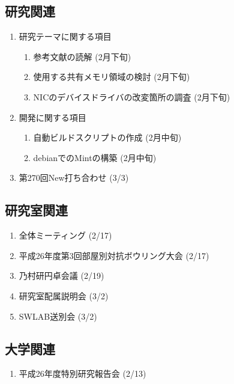 \documentclass[fleqn, 14pt]{extarticle}
\begin{document}
\subsection{研究関連}
\label{sec-4-1}

\begin{enumerate}
\item 研究テーマに関する項目
\hfill
\begin{enumerate}


\item 参考文献の読解
\hfill
(2月下旬)

\item 使用する共有メモリ領域の検討
\hfill
(2月下旬)

\item NICのデバイスドライバの改変箇所の調査
\hfill
(2月下旬)

\end{enumerate}
\item 開発に関する項目
\hfill
\begin{enumerate}

\item 自動ビルドスクリプトの作成
\hfill
(2月中旬)

\item debianでのMintの構築
\hfill
(2月中旬)

\end{enumerate}
\item 第270回New打ち合わせ
\hfill
\label{enum-7}
(3/3)
\end{enumerate}

\subsection{研究室関連}
\label{sec-4-2}

\begin{enumerate}

\item 全体ミーティング 
\hfill
\label{enum-18}
(2/17)

\item 平成26年度第3回部屋別対抗ボウリング大会 
\hfill
\label{enum-18}
(2/17)

\item 乃村研円卓会議 
\hfill
\label{enum-18}
(2/19)


\item 研究室配属説明会 
\hfill
\label{enum-18}
(3/2)

\item SWLAB送別会
\hfill
\label{enum19}
(3/2)
\end{enumerate}

\subsection{大学関連}
\begin{enumerate}
\item 平成26年度特別研究報告会 
\hfill
\label{enum-17}
(2/13)


\end{enumerate}
\end{document}
